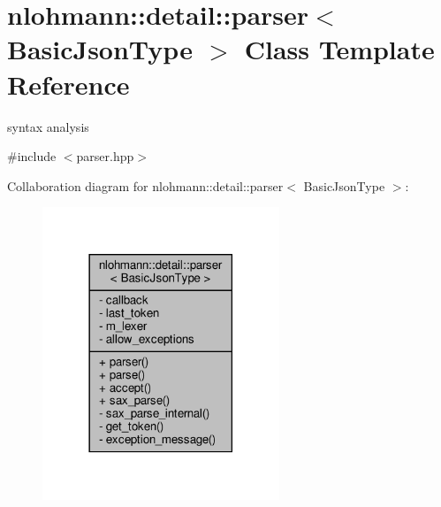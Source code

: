 \hypertarget{classnlohmann_1_1detail_1_1parser}{}\section{nlohmann\+:\+:detail\+:\+:parser$<$ Basic\+Json\+Type $>$ Class Template Reference}
\label{classnlohmann_1_1detail_1_1parser}


syntax analysis  




{\ttfamily \#include $<$parser.\+hpp$>$}



Collaboration diagram for nlohmann\+:\+:detail\+:\+:parser$<$ Basic\+Json\+Type $>$\+:\nopagebreak
\begin{figure}[H]
\begin{center}
\leavevmode
\includegraphics[width=201pt]{classnlohmann_1_1detail_1_1parser__coll__graph}
\end{center}
\end{figure}
